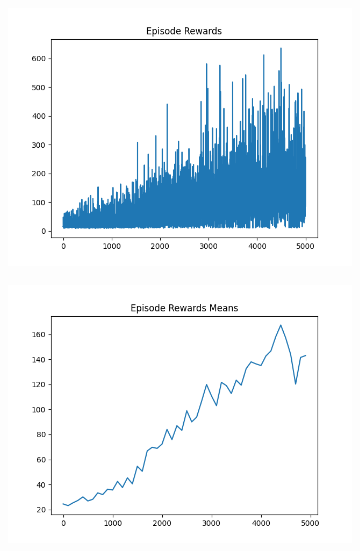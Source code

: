 \begin{figure}[H]
    \centering
    \begin{subfigure}{.47\linewidth}
        \centering
        \includegraphics[width=\textwidth]{pole/2024-06-13_20-39-12_dqn_cartpole_episode_rewards.png}
    \end{subfigure}
    \begin{subfigure}{.47\linewidth}
        \centering
        \includegraphics[width=\textwidth]{pole/2024-06-13_20-39-12_dqn_cartpole_episode_rewards_means.png}
    \end{subfigure}
    \begin{subfigure}{.47\linewidth}
        \centering

\end{subfigure}
\end{figure}
